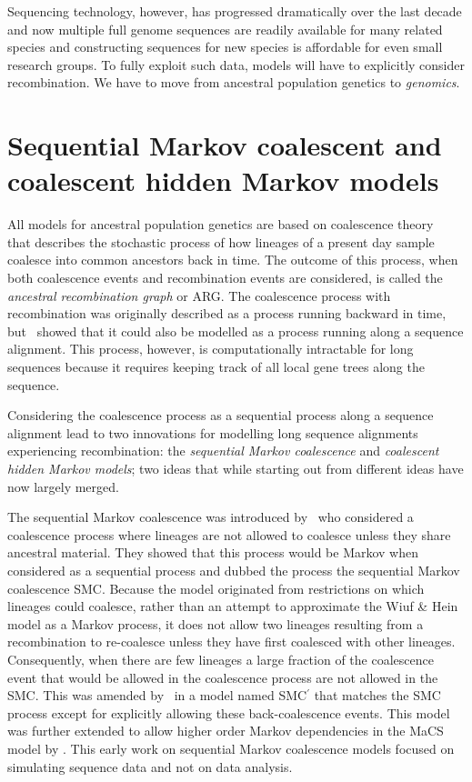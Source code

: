 Sequencing technology, however, has progressed dramatically over the last decade and now multiple full genome sequences are readily available for many related species and constructing sequences for new species is affordable for even small research groups. To fully exploit such data, models will have to explicitly consider recombination. We have to move from ancestral population genetics to \emph{genomics}.


\section{Sequential Markov coalescent and coalescent hidden Markov models}

All models for ancestral population genetics are based on coalescence theory~\cite{Hein:2005vz} that describes the stochastic process of how lineages of a present day sample coalesce into common ancestors back in time. The outcome of this process, when both coalescence events and recombination events are considered, is called the \emph{ancestral recombination graph} or ARG. The coalescence process with recombination was originally described as a process running backward in time, but~\citet{Wiuf:1999gu} showed that it could also be modelled as a process running along a sequence alignment. This process, however, is computationally intractable for long sequences because it requires keeping track of all local gene trees along the sequence.

Considering the coalescence process as a sequential process along a sequence alignment lead to two innovations for modelling long sequence alignments experiencing recombination: the \emph{sequential Markov coalescence} and \emph{coalescent hidden Markov models}; two ideas that while starting out from different ideas have now largely merged.

The sequential Markov coalescence was introduced by~\citet{McVean:2005ho} who considered a coalescence process where lineages are not allowed to coalesce unless they share ancestral material. They showed that this process would be Markov when considered as a sequential process and dubbed the process the sequential Markov coalescence SMC. Because the model originated from restrictions on which lineages could coalesce, rather than an attempt to approximate the Wiuf \& Hein model as a Markov process, it does not allow two lineages resulting from a recombination to re-coalesce unless they have first coalesced with other lineages. Consequently, when there are few lineages a large fraction of the coalescence event that would be allowed in the coalescence process are not allowed in the SMC. This was amended by~\citet{Marjoram:2006hp} in a model named SMC$^\prime$ that matches the SMC process except for explicitly allowing these back-coalescence events. This model was further extended to allow higher order Markov dependencies in the MaCS model by \citet{Chen:2009fg}. This early work on sequential Markov coalescence models focused on simulating sequence data and not on data analysis.

